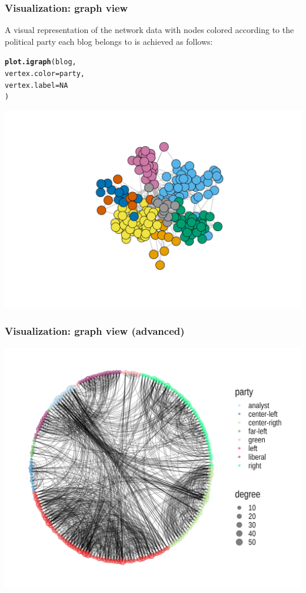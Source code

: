\documentclass{beamer}\usepackage[]{graphicx}\usepackage[]{color}
\makeatletter
\newcommand{\hlnum}[1]{\textcolor[rgb]{0.686,0.059,0.569}{#1}}%
\newcommand{\hlstd}[1]{\textcolor[rgb]{0.345,0.345,0.345}{#1}}%
\newcommand{\hlkwc}[1]{\textcolor[rgb]{0.333,0.667,0.333}{#1}}%
\newcommand{\hlkwd}[1]{\textcolor[rgb]{0.737,0.353,0.396}{\textbf{#1}}}%
\newenvironment{kframe}{%
 \def\at@end@of@kframe{}%
 \ifinner\ifhmode%
  \def\at@end@of@kframe{\end{minipage}}%
  \begin{minipage}{\columnwidth}%
 \fi\fi%
 \def\FrameCommand##1{\hskip\@totalleftmargin \hskip-\fboxsep
 \colorbox{shadecolor}{##1}\hskip-\fboxsep
     \hskip-\linewidth \hskip-\@totalleftmargin \hskip\columnwidth}%
 \MakeFramed {\advance\hsize-\width
   \@totalleftmargin\z@ \linewidth\hsize
   \@setminipage}}%
 {\par\unskip\endMakeFramed%
 \at@end@of@kframe}
\newenvironment{knitrout}{}{} %
\makeatother
\begin{document}
\begin{frame}[fragile]
  \frametitle{Visualization: graph view}

A visual representation of the network data with nodes colored according to the political party each blog belongs to is achieved as follows:

\begin{knitrout}\scriptsize
{}\color{fgcolor}\begin{kframe}
\begin{alltt}
\hlkwd{plot.igraph}\hlstd{(blog,}
  \hlkwc{vertex.color} \hlstd{= party,}
  \hlkwc{vertex.label} \hlstd{=} \hlnum{NA}
 \hlstd{)}
\end{alltt}
\end{kframe}
\includegraphics[width=.8\textwidth]{figures/frenchblog-igraph-plot-1} 
\end{knitrout}

\end{frame}

\begin{frame}[fragile]
  \frametitle{Visualization: graph view (advanced)}



\includegraphics[height=.9\textheight]{figures/fancy_frenchblog2007.png}

\end{frame}
\end{document}
